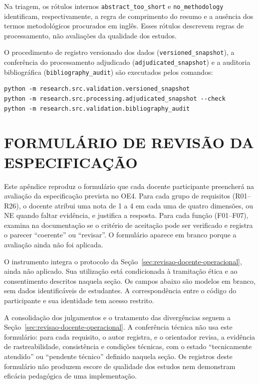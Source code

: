 \begin{apendicesenv}
Na triagem, os rótulos internos \texttt{abstract\_too\_short} e \texttt{no\_methodology} identificam, respectivamente, a regra de comprimento do resumo e a ausência dos termos metodológicos procurados em inglês. Esses rótulos descrevem regras de processamento, não avaliações da qualidade dos estudos.

O procedimento de registro versionado dos dados (\texttt{versioned\_snapshot}), a conferência do processamento adjudicado (\texttt{adjudicated\_snapshot}) e a auditoria bibliográfica (\texttt{bibliography\_audit}) são executados pelos comandos:
\begin{verbatim}
python -m research.src.validation.versioned_snapshot
python -m research.src.processing.adjudicated_snapshot --check
python -m research.src.validation.bibliography_audit
\end{verbatim}



\chapter{FORMULÁRIO DE REVISÃO DA ESPECIFICAÇÃO}
\label{apendice:formulario-oe4}

Este apêndice reproduz o formulário que cada docente participante preencherá na avaliação da especificação prevista no OE4. Para cada grupo de requisitos (R01--R26), o docente atribui uma nota de 1 a 4 em cada uma de quatro dimensões, ou NE quando faltar evidência, e justifica a resposta. Para cada função (F01--F07), examina na documentação se o critério de aceitação pode ser verificado e registra o parecer ``coerente'' ou ``revisar''. O formulário aparece em branco porque a avaliação ainda não foi aplicada.

O instrumento integra o protocolo da Seção~\ref{sec:revisao-docente-operacional}, ainda não aplicado. Sua utilização está condicionada à tramitação ética e ao consentimento descritos naquela seção. Os campos abaixo são modelos em branco, sem dados identificáveis de estudantes. A correspondência entre o código do participante e sua identidade tem acesso restrito.

A consolidação dos julgamentos e o tratamento das divergências seguem a Seção~\ref{sec:revisao-docente-operacional}. A conferência técnica não usa este formulário: para cada requisito, o autor registra, e o orientador revisa, a evidência de rastreabilidade, consistência e condições técnicas, com o estado ``tecnicamente atendido'' ou ``pendente técnico'' definido naquela seção. Os registros deste formulário não produzem escore de qualidade dos estudos nem demonstram eficácia pedagógica de uma implementação.


\end{apendicesenv}
